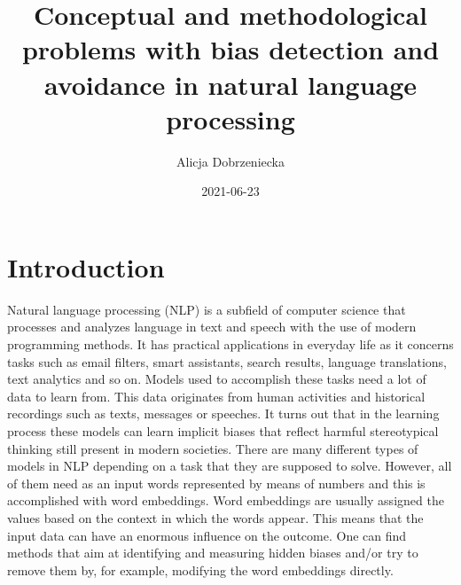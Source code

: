 \documentclass[
  12pt,
]{book}
\title{Conceptual and methodological problems with bias detection and avoidance in natural language processing}
\author{Alicja Dobrzeniecka}
\date{2021-06-23}
\begin{document}
\maketitle

{
\hypersetup{linkcolor=}
\setcounter{tocdepth}{5}
\tableofcontents
}
\hypertarget{introduction}{%
\chapter{Introduction}\label{introduction}}

Natural language processing (NLP) is a subfield of computer science that processes and analyzes language in text and speech with the use of modern programming methods. It has practical applications in everyday life as it concerns tasks such as email filters, smart assistants, search results, language translations, text analytics and so on. Models used to accomplish these tasks need a lot of data to learn from. This data originates from human activities and historical recordings such as texts, messages or speeches. It turns out that in the learning process these models can learn implicit biases that reflect harmful stereotypical thinking still present in modern societies. There are many different types of models in NLP depending on a task that they are supposed to solve. However, all of them need as an input words represented by means of numbers and this is accomplished with word embeddings. Word embeddings are usually assigned the values based on the context in which the words appear. This means that the input data can have an enormous influence on the outcome. One can find methods that aim at identifying and measuring hidden biases and/or try to remove them by, for example, modifying the word embeddings directly.
\end{document}
